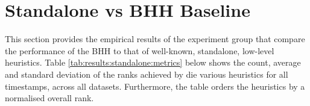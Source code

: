 \section{Standalone vs BHH Baseline}
\label{sec:results:standalone}

This section provides the empirical results of the experiment group that compare the performance of the \Ac{BHH} to that of well-known, standalone, low-level heuristics. Table \ref{tab:results:standalone:metrics} below shows the count, average and standard deviation of the ranks achieved by die various heuristics for all timestamps, across all datasets. Furthermore, the table orders the heuristics by a normalised overall rank.

\begin{table}[htbp]
	\centering
	\caption{Empirical results showcasing rank statistics for different standalone heuristics compared to the baseline \acs{BHH} across multiple datasets}
	\label{tab:results:standalone:metrics}%
	\par\bigskip
\end{table}
